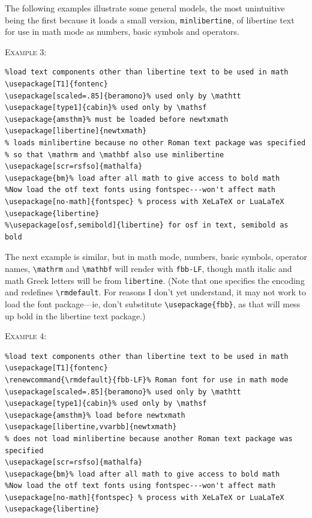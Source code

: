 \documentclass[\fsc]{article}
\theoremstyle{oldplain}
\theoremstyle{plain}
\begin{document}
The following examples illustrate some general models, the most unintuitive being the first because it loads a small version, {\tt minlibertine}, of libertine text for use in math mode as numbers, basic symbols and operators.

\textsc{Example 3:}
\begin{verbatim}
%load text components other than libertine text to be used in math
\usepackage[T1]{fontenc}
\usepackage[scaled=.85]{beramono}% used only by \mathtt
\usepackage[type1]{cabin}% used only by \mathsf
\usepackage{amsthm}% must be loaded before newtxmath
\usepackage[libertine]{newtxmath}
% loads minlibertine because no other Roman text package was specified
% so that \mathrm and \mathbf also use minlibertine
\usepackage[scr=rsfso]{mathalfa}
\usepackage{bm}% load after all math to give access to bold math
%Now load the otf text fonts using fontspec---won't affect math
\usepackage[no-math]{fontspec} % process with XeLaTeX or LuaLaTeX
\usepackage{libertine}
%\usepackage[osf,semibold]{libertine} for osf in text, semibold as bold
\end{verbatim}
The next example is similar, but in math mode, numbers, basic symbols, operator names, \verb|\mathrm| and \verb|\mathbf| will render with {\tt fbb-LF}, though  math italic and math Greek letters will be from {\tt libertine}. (Note that one specifies the encoding and redefines \verb|\rmdefault|. For reasons I don't yet understand, it may not work to load the font package---ie, don't substitute \verb|\usepackage{fbb}|, as that will mess up bold in the libertine text package.) 

\textsc{Example 4:}
\begin{verbatim}
%load text components other than libertine text to be used in math
\usepackage[T1]{fontenc}
\renewcommand{\rmdefault}{fbb-LF}% Roman font for use in math mode
\usepackage[scaled=.85]{beramono}% used only by \mathtt
\usepackage[type1]{cabin}% used only by \mathsf
\usepackage{amsthm}% load before newtxmath
\usepackage[libertine,vvarbb]{newtxmath}
% does not load minlibertine because another Roman text package was specified
\usepackage[scr=rsfso]{mathalfa}
\usepackage{bm}% load after all math to give access to bold math
%Now load the otf text fonts using fontspec---won't affect math
\usepackage[no-math]{fontspec} % process with XeLaTeX or LuaLaTeX
\usepackage{libertine}
\end{verbatim}
\end{document}
